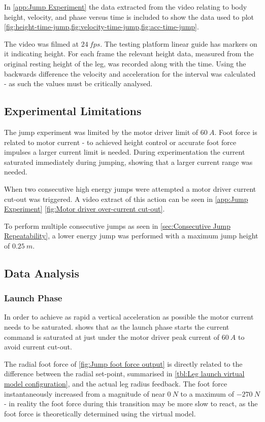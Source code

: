 In \cref{app:Jump Experiment} the data extracted from the video relating to body height, velocity, and phase versus time is included to show the data used to plot \cref{fig:height-time-jump,fig:velocity-time-jump,fig:acc-time-jump}. 

The video was filmed at $24\ fps$. The testing platform linear guide has markers on it indicating height. For each frame the relevant height data, measured from the original resting height of the leg, was recorded along with the time. Using the backwards difference the velocity and acceleration for the interval was calculated - as such the values must be critically analysed.

\subsection{Experimental Limitations}

The jump experiment was limited by the motor driver limit of $60\ A$. Foot force is related to motor current - to achieved height control or accurate foot force impulses a larger current limit is needed. During experimentation the current saturated immediately during jumping, showing that a larger current range was needed. 

When two consecutive high energy jumps were attempted a motor driver current cut-out was triggered. A video extract of this action can be seen in \cref{app:Jump Experiment} \cref{fig:Motor driver over-current cut-out}. 

To perform multiple consecutive jumps as seen in \cref{sec:Consecutive Jump Repeatability}, a lower energy jump was performed with a maximum jump height of $0.25\ m$.

\subsection{Data Analysis}

\subsubsection{Launch Phase}

In order to achieve as rapid a vertical acceleration as possible the motor current needs to be saturated.  shows that as the launch phase starts the current command is saturated at just under the motor driver peak current of $60\ A$ to avoid current cut-out.

The radial foot force of \cref{fig:Jump foot force output} is directly related to the difference between the radial set-point, summarised in \cref{tbl:Leg launch virtual model configuration}, and the actual leg radius feedback. The foot force instantaneously increased from a magnitude of near $0\ N$ to a maximum of $-270\ N$ - in reality the foot force during this transition may be more slow to react, as the foot force is theoretically determined using the virtual model.

